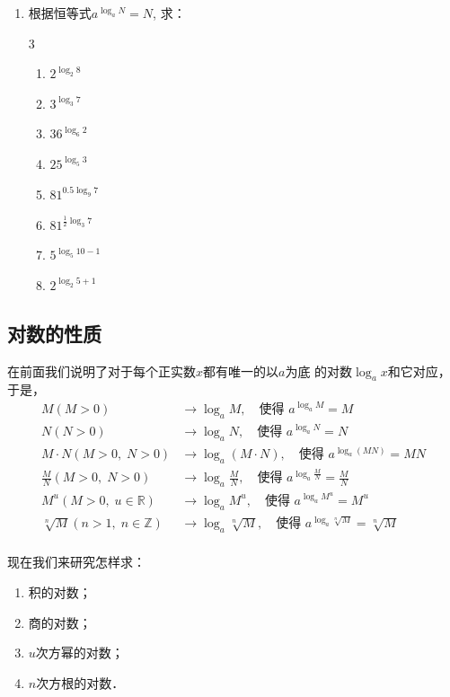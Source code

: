 \begin{ex}
\begin{enumerate}
\item 根据恒等式$a^{\log_a N}=N$, 求：
\begin{multicols}{3}
    \begin{enumerate}
        \item $2^{\log_2 8}$
        \item $3^{\log_3 7}$
        \item $36^{\log_6 2}$
        \item $25^{\log_5 3}$
        \item $81^{0.5\log_9 7}$
        \item $81^{\tfrac{1}{2}\log_3 7}$
        \item $5^{\log_5 10-1}$
        \item $2^{\log_2 5+1}$
    \end{enumerate}
    \end{multicols} 
\end{enumerate} 
\end{ex}

\subsection{对数的性质}
在前面我们说明了对于每个正实数$x$都有唯一的以$a$为底
的对数$\log_a x$和它对应，于是，
\[\begin{split}
   M(M>0)&\longrightarrow \log_a M,\quad \text{使得 } a^{\log_a M}=M \\
   N(N>0)&\longrightarrow \log_a N,\quad \text{使得 } a^{\log_a N}=N \\
   M\cdot N(M>0,\; N>0)&\longrightarrow \log_a (M\cdot N),\quad \text{使得 } a^{\log_a (MN)}=MN \\
   \frac{M}{N}(M>0,\; N>0)&\longrightarrow \log_a \frac{M}{N},\quad \text{使得 } a^{\log_a \tfrac{M}{N}}=\frac{M}{N} \\
   M^u(M>0,\; u\in\mathbb{R})&\longrightarrow \log_a M^u,\quad \text{使得 } a^{\log_a M^u}=M^u \\
   \sqrt[n]{M}(n>1,\; n\in\mathbb{Z})&\longrightarrow \log_a \sqrt[n]{M},\quad \text{使得 } a^{\log_a \sqrt[n]{M}}=\sqrt[n]{M} \\
\end{split}\]

现在我们来研究怎样求：
\begin{enumerate}
    \item 积的对数；
    \item 商的对数；
    \item $u$次方幂的对数；
    \item $n$次方根的对数．
\end{enumerate}

